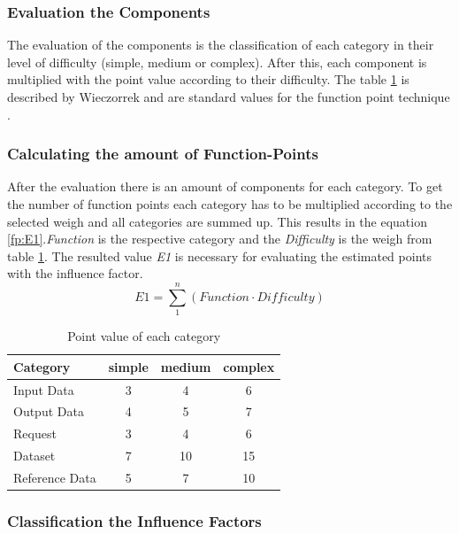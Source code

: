 \subsubsection{Evaluation the Components}

The evaluation of the components is the classification of each category in their level of difficulty (simple, medium or complex). After this, each component is multiplied with the point value according to their difficulty. The table \ref{tab:pointvalues} is described by Wieczorrek and are standard values for the function point technique \cite{fpafundamentals}.

\subsubsection{ Calculating the amount of Function-Points}

After the evaluation there is an amount of components for each category. To get the number of function points each category has to be multiplied according to the selected weigh and all categories are summed up. This results in the equation \ref{fp:E1}.\textit{Function} is the respective category and the \textit{Difficulty} is the weigh from table \ref{tab:pointvalues}. The resulted value \textit{E1} is necessary for evaluating the estimated points with the influence factor.
\begin{equation}
	\textit{E1} =  \sum \limits_{1}^n  (\textit{Function} \cdot \textit{Difficulty}) \label{fp:E1}
\end{equation}
\begin{table}[h] 
	\centering 
	\setlength{\tabcolsep}{4pt}
	\begin{tabular}{|l|c|c|c|}\hline
		Category & simple & medium & complex \\ \hline
		Input Data & 3 & 4 & 6\\ \hline
		Output Data & 4 & 5 & 7\\ \hline
		Request & 3 & 4 & 6\\ \hline
		Dataset & 7 & 10 & 15\\ \hline
		Reference Data & 5 & 7 & 10\\ \hline
	\end{tabular}
	\caption{Point value of each category} 
	\label{tab:pointvalues} 
\end{table}
\subsubsection{ Classification the Influence Factors}\label{fp:classificationInfluence}

